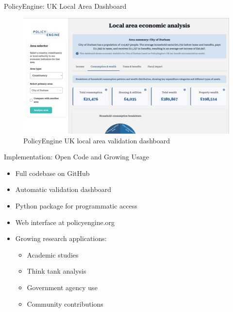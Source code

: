 \documentclass{beamer}
\begin{document}
\begin{frame}{PolicyEngine: UK Local Area Dashboard}
    \begin{figure}
        \centering
        \includegraphics[width=\textwidth]{../../paper/figures/uk_local_dashboard.png}
        \caption{PolicyEngine UK local area validation dashboard}
    \end{figure}
\end{frame}

\begin{frame}{Implementation: Open Code and Growing Usage}
    \begin{itemize}
        \item Full codebase on GitHub
        \item Automatic validation dashboard
        \item Python package for programmatic access
        \item Web interface at policyengine.org
        \item Growing research applications:
        \begin{itemize}
            \item Academic studies
            \item Think tank analysis
            \item Government agency use
            \item Community contributions
        \end{itemize}
    \end{itemize}
\end{frame}
\end{document}
